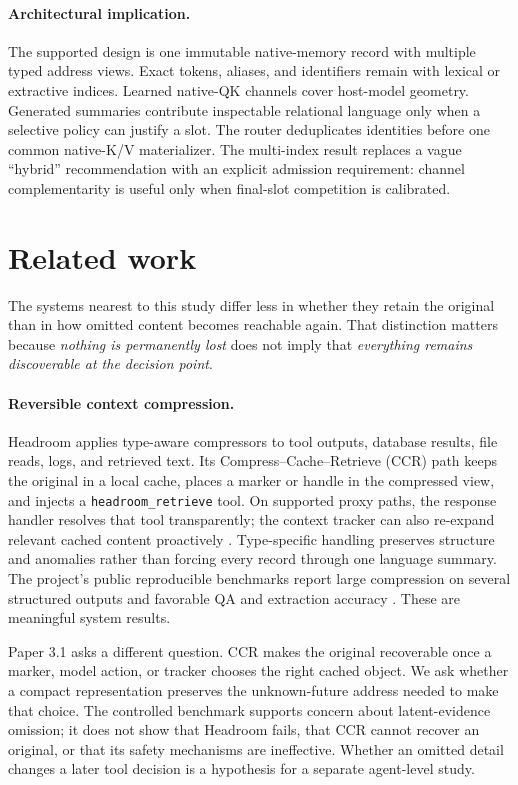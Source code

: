 \documentclass[11pt]{article}
\newcommand{\kv}{K/V\xspace}
\newcommand{\code}[1]{\texttt{#1}}
\begin{document}
\paragraph{Architectural implication.}
The supported design is one immutable native-memory record with multiple typed
address views. Exact tokens, aliases, and identifiers remain with lexical or
extractive indices. Learned native-QK channels cover host-model geometry.
Generated summaries contribute inspectable relational language only when a
selective policy can justify a slot. The router deduplicates identities before
one common native-\kv materializer. The multi-index result replaces a vague
``hybrid'' recommendation with an explicit admission requirement: channel
complementarity is useful only when final-slot competition is calibrated.

\section{Related work}

The systems nearest to this study differ less in whether they retain the
original than in how omitted content becomes reachable again. That distinction
matters because \emph{nothing is permanently lost} does not imply that
\emph{everything remains discoverable at the decision point}.

\paragraph{Reversible context compression.}
Headroom applies type-aware compressors to tool outputs, database results, file
reads, logs, and retrieved text. Its Compress--Cache--Retrieve (CCR) path keeps
the original in a local cache, places a marker or handle in the compressed
view, and injects a \code{headroom\_retrieve} tool. On supported proxy paths,
the response handler resolves that tool transparently; the context tracker can
also re-expand relevant cached content proactively
\cite{headroomCCR,headroomArchitecture}. Type-specific handling preserves
structure and anomalies rather than forcing every record through one language
summary. The project's public reproducible benchmarks report large compression
on several structured outputs and favorable QA and extraction accuracy
\cite{headroomBenchmarks}. These are meaningful system results.

Paper 3.1 asks a different question. CCR makes the original recoverable once a
marker, model action, or tracker chooses the right cached object. We ask whether
a compact representation preserves the unknown-future address needed to make
that choice. The controlled benchmark supports concern about latent-evidence
omission; it does not show that Headroom fails, that CCR cannot recover an
original, or that its safety mechanisms are ineffective. Whether an omitted
detail changes a later tool decision is a hypothesis for a separate agent-level
study.
\end{document}
